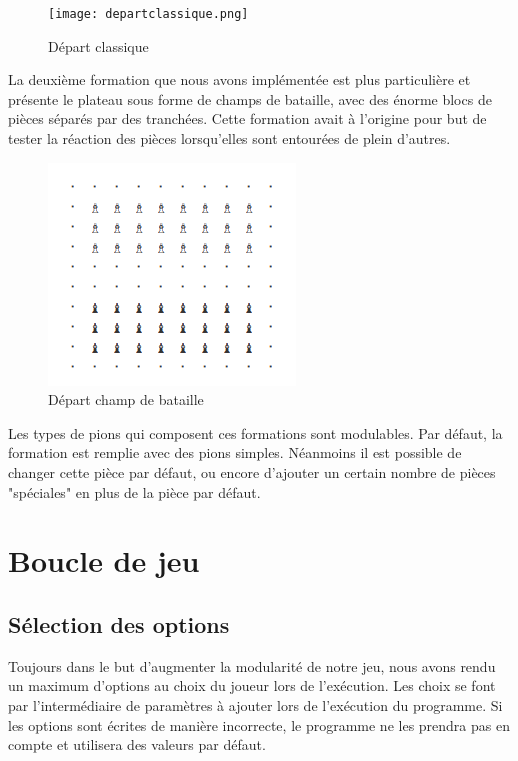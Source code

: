             \begin{figure}[H]
                \centering
                \texttt{[image: departclassique.png]}
                \caption{Départ classique}
                \label{fig:depart_classique}
            \end{figure}

            La deuxième formation que nous avons implémentée est plus particulière et présente le plateau sous forme de champs de bataille, avec des énorme blocs de pièces séparés par des tranchées. Cette formation avait à l'origine pour but de tester la réaction des pièces lorsqu'elles sont entourées de plein d'autres. \\
            
            \begin{figure}[H]
                \centering
                \includegraphics[scale=0.6]{img/battleground.png}
                \caption{Départ champ de bataille}
                \label{fig:depart_champ_de_bataille}
            \end{figure}

            Les types de pions qui composent ces formations sont modulables. Par défaut, la formation est remplie avec des pions simples. Néanmoins il est possible de changer cette pièce par défaut, ou encore d'ajouter un certain nombre de pièces "spéciales" en plus de la pièce par défaut. 
            
    \section{Boucle de jeu}

        \subsection{Sélection des options}
            Toujours dans le but d'augmenter la modularité de notre jeu, nous avons rendu un maximum d'options au choix du joueur lors de l'exécution. Les choix se font par l'intermédiaire de paramètres à ajouter lors de l'exécution du programme. Si les options sont écrites de manière incorrecte, le programme ne les prendra pas en compte et utilisera des valeurs par défaut.
            

